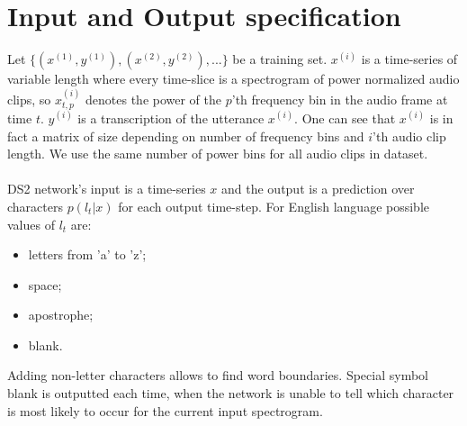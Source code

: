 \documentclass[licencjacka,en]{pracamgr}
\begin{document}
\section{Input and Output specification}
Let $\{(x^{(1)}, y^{(1)}), (x^{(2)}, y^{(2)}), ...\}$ be a training set. $x^{(i)}$ is a time-series of variable length where every time-slice is a spectrogram of power
normalized audio clips, so $x^{(i)}_{t,p}$ denotes the power of the $p$’th frequency bin in the audio frame at time $t$. $y^{(i)}$ is a transcription of the utterance $x^{(i)}$. One can see that $x^{(i)}$ is in fact a matrix of size depending on number of frequency bins and $i$'th audio clip length. We use the same number of power bins for all audio clips in dataset.\\\\
DS2 network's input is a time-series $x$ and the output is a prediction over characters $p(l_t|x)$ for each output time-step. For English language possible values of $l_t$ are:

\begin{itemize}
  \item letters from 'a' to 'z';
  \item space;
  \item apostrophe;
  \item blank.
\end{itemize}

Adding non-letter characters allows to find word boundaries. Special symbol blank is outputted each time, when the network is unable
to tell which character is most likely to occur for the current input spectrogram.
\end{document}
